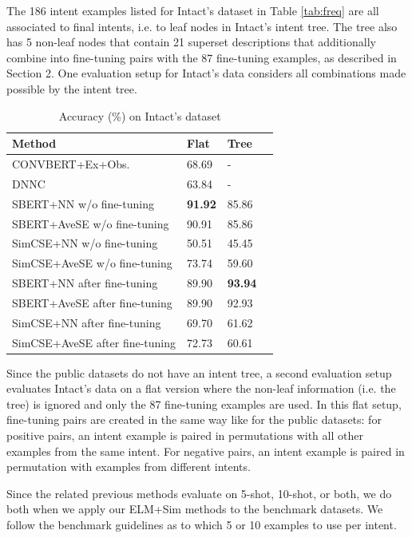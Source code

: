 \documentclass[sigconf, anonymous=true]{acmart}
\begin{document}
The 186 intent examples listed for Intact's dataset in Table \ref{tab:freq} are all associated to final intents, i.e. to leaf nodes in Intact's intent tree. The tree also has 5 non-leaf nodes that contain 21 superset descriptions that additionally combine into fine-tuning pairs with the 87 fine-tuning examples, as described in Section 2. One evaluation setup for Intact's data considers all combinations made possible by the intent tree. 

\begin{table}[b]
\setlength{} %
\footnotesize\centering
\begin{tabular}{llll}
\hline \textbf{Method} & \textbf{Flat} & \textbf{Tree} \\
\hline
CONVBERT+Ex+Obs. & 68.69 & - \\
DNNC & 63.84 & - \\
\hline SBERT+NN w/o fine-tuning & \textbf{91.92} & 85.86  \\
SBERT+AveSE w/o fine-tuning & 90.91 & 85.86  \\
SimCSE+NN w/o fine-tuning & 50.51 & 45.45  \\
SimCSE+AveSE w/o fine-tuning & 73.74 & 59.60  \\
\midrule
SBERT+NN after fine-tuning & 89.90 & \textbf{93.94}  \\
SBERT+AveSE after fine-tuning & 89.90 & 92.93  \\
SimCSE+NN after fine-tuning & 69.70 & 61.62  \\
SimCSE+AveSE after fine-tuning & 72.73 & 60.61  \\
\midrule
\end{tabular}
\caption{Accuracy (\%) on Intact's dataset}
\label{tab:accuracyIntact}
\end{table}

Since the public datasets do not have an intent tree, a second evaluation setup evaluates Intact's data on a flat version where the non-leaf information (i.e. the tree) is ignored and only the 87 fine-tuning examples are used. In this flat setup, fine-tuning pairs are created in the same way like for the public datasets: for positive pairs, an intent example is paired in permutations with all other examples from the same intent. For negative pairs, an intent example is paired in permutation with examples from different intents. 

Since the related previous methods evaluate on 5-shot, 10-shot, or both, we do both when we apply our ELM+Sim methods to the benchmark datasets. We follow the benchmark guidelines as to which 5 or 10 examples to use per intent. 
\end{document}
